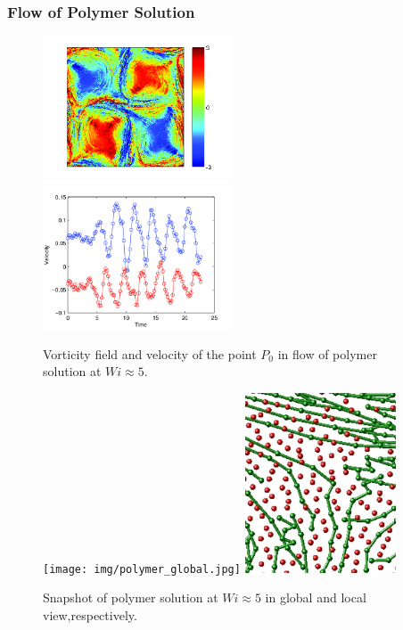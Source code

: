\begin{frame}
  \frametitle{Flow of Polymer Solution}
\begin{figure}[ht]
\includegraphics[width=0.5\textwidth]{img/polymer_loc-13.png}
\includegraphics[width=0.5\textwidth]{img/polymer_loc-7.png}
\caption{Vorticity field and velocity of the point $P_0$ in flow of polymer solution at $Wi\approx5$.}
\label{fug:vor_pol5}
\end{figure}
\end{frame}

\begin{frame}
 \begin{figure}
    \centering
    \texttt{[image: img/polymer\_global.jpg]}
    \includegraphics[width=0.4\textwidth]{img/polymer_local_3}

    \caption{Snapshot of polymer solution at $Wi\approx5$ in global and local view,respectively.}
    \label{fig:vor_sol}
  \end{figure}
\end{frame}

